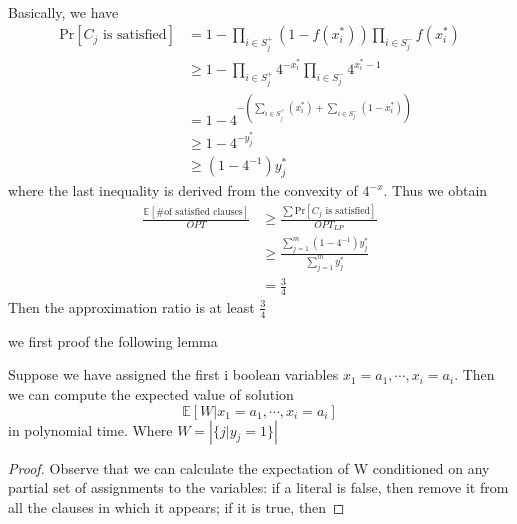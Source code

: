 \documentclass[12pt]{article}
\newenvironment{lemma}[2][Lemma]{\begin{trivlist}
\item[\hskip \labelsep {\bfseries #1}\hskip \labelsep {\bfseries #2.}]}{\end{trivlist}}
\newenvironment{solution}[2][Solution]{\begin{trivlist}
\item[\hskip \labelsep {\bfseries #1}\hskip \labelsep {\bfseries #2.}]}{\end{trivlist}}
\begin{document}
\begin{solution}{3}
    ~

    \begin{itemize}
        \item Basically, we have
              \begin{align*}
                  \mathrm{Pr}[\text{$C_j$ is satisfied}] & = 1 - \prod_{i\in S_j^+}(1-f(x_i^*))\prod_{i\in S_j^-}f(x_i^*)   \\
                                                         & \ge 1-\prod_{i\in S_j^+}4^{-x_i^*}\prod_{i\in S_j^-}4^{x_i^*-1}  \\
                                                         & = 1-4^{-(\sum_{i\in S_j^+}(x_i^*)+\sum_{i\in S_j^-}(1-x_i^*))} \\
                                                         & \ge 1-4^{-y_j^*}                                                 \\
                                                         & \ge (1-4^{-1})y_j^*
              \end{align*}
              where the last inequality is derived from the convexity of $4^{-x}$. Thus we obtain
              \begin{align*}
                  \frac{\mathbb{E}[\text{\# of satisfied clauses}]}{OPT} & \ge \frac{\sum\mathrm{Pr}[\text{$C_j$ is satisfied}]}{OPT_{LP}} \\
                                                                         & \ge \frac{\sum_{j=1}^{m}(1-4^{-1})y_j^*}{\sum_{j=1}^{m}y_j^*}   \\
                                                                         & = \frac34
              \end{align*}
              Then the approximation ratio is at least $\frac{3}{4}$
        \item we first proof the following lemma
              \begin{lemma}{*}
                  Suppose we have assigned the first i boolean variables $x_1 = a_1, \cdots, x_i = a_i$. Then we can compute
                  the expected value of solution
                  \[\mathbb{E}[W|x_1 = a_1, \cdots, x_i = a_i]\]
                  in polynomial time. Where $W=|\{{j|y_j = 1}\}|$
              \end{lemma}
              \begin{proof}
                  Observe that we can calculate the expectation of W conditioned on any partial set of assignments
                  to the variables: if a literal is false, then remove it from all the clauses in which it appears; if it is true, then

\end{proof}
\end{itemize}
\end{solution}
\end{document}
